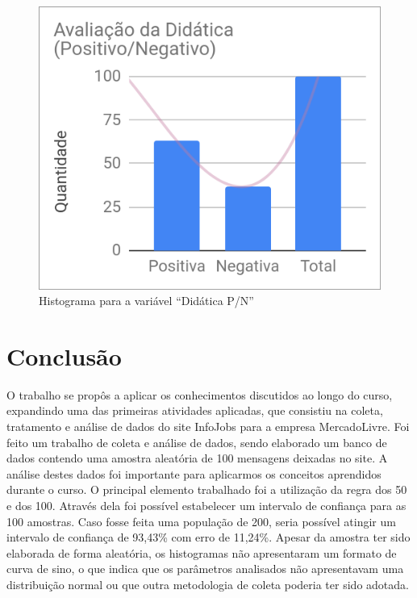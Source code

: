 	\begin{figure}[H]
		\centering
		\caption{Histograma para a variável ``Didática P/N''}
		\label{fig:recomendacao}
		\includegraphics[width=0.5\linewidth]{img/ufabc_didatica}
	\end{figure}

	\chapter{Conclusão}
	
	O trabalho se propôs a aplicar os conhecimentos discutidos ao longo do curso, expandindo uma das primeiras atividades aplicadas, que consistiu na coleta, tratamento e análise de dados do site InfoJobs para a empresa MercadoLivre. Foi feito um trabalho de coleta e análise de dados, sendo elaborado um banco de dados contendo uma amostra aleatória de 100 mensagens deixadas no site. A análise destes dados foi importante para aplicarmos os conceitos aprendidos durante o curso. O principal elemento trabalhado foi a utilização da regra dos 50 e dos 100. Através dela foi possível estabelecer um intervalo de confiança para as 100 amostras. Caso fosse feita uma população de 200, seria possível atingir um intervalo de confiança de 93,43\% com erro de 11,24\%. Apesar da amostra ter sido elaborada de forma aleatória, os histogramas não apresentaram um formato de curva de sino, o que indica que os parâmetros analisados não apresentavam uma distribuição normal ou que outra metodologia de coleta poderia ter sido adotada.

	
	\postextual
	
	
	
	
	\renewcommand{\glossaryname}{Glossário}
	\renewcommand*{\glsseeformat}[3][\seename]{\textit{#1}
		\glsseelist{#2}}
	
